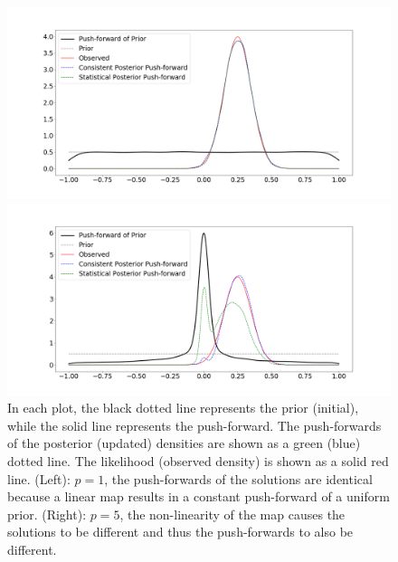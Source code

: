 \begin{ex}
\begin{figure}
\begin{minipage}{.45\textwidth}
		\includegraphics[width=\linewidth]{./images/comparison1}
\end{minipage}
\begin{minipage}{.45\textwidth}
		\includegraphics[width=\linewidth]{./images/comparison5}
\end{minipage}
\caption{
In each plot, the black dotted line represents the prior (initial), while the solid line represents the push-forward.
The push-forwards of the posterior (updated) densities are shown as a green (blue) dotted line.
The likelihood (observed density) is shown as a solid red line.
(Left): $p = 1$, the push-forwards of the solutions are identical because a linear map results in a constant push-forward of a uniform prior.
(Right): $p = 5$, the non-linearity of the map causes the solutions to be different and thus the push-forwards to also be different.
}
\label{fig:comparison}
\end{figure}



\end{ex}
